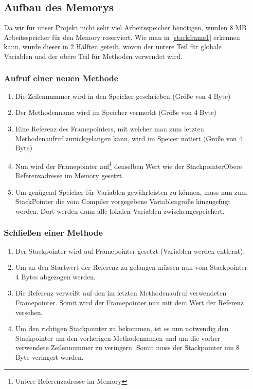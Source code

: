 \subsection{Aufbau des Memorys}
Da wir für unser Projekt nicht sehr viel Arbeitsspeicher benötigen, wurden 8 MB Arbeitsspeicher für den Memory reserviert.
Wie man in \ref{stackframe1} erkennen kann, wurde dieser in 2 Hälften geteilt, wovon der untere Teil für globale Variablen
und der obere Teil für Methoden verwendet wird.


\subsubsection{Aufruf einer neuen Methode}
\begin{enumerate}
 \item Die Zeilennummer wird in den Speicher geschrieben (Größe von 4 Byte)
 \item Der Methodenname wird im Speicher vermerkt (Größe von 4 Byte)
 \item Eine Referenz des Framepointers, mit welcher man zum letzten Methodenaufruf zurückgelangen kann, wird im Speicer notiert (Größe von 4 Byte)
 \item Nun wird der Framepointer auf\footnote{Untere Referenzadresse im Memory} denselben Wert wie der Stackpointer{Obere Referenzadresse im Memory} gesetzt.
 \item Um genügend Speicher für Variablen gewährleisten zu können, muss nun zum StackPointer die vom Compiler vorgegebene Variablengröße
 hinzugefügt werden. Dort werden dann alle lokalen Variablen zwischengespeichert.
\end{enumerate}
 
\subsubsection{Schließen einer Methode}
\begin{enumerate}
 \item Der Stackpointer wird auf Framepointer gesetzt (Variablen werden entfernt).
 \item Um an den Startwert der Referenz zu gelangen müssen nun vom Stackpointer 4 Bytes abgezogen werden.
 \item Die Referenz verweißt auf den im letzten Methodenaufruf verwendeten Framepointer. Somit wird der Framepointer nun mit dem Wert
 der Referenz versehen.
 \item Um den richtigen Stackpointer zu bekommen, ist es nun notwendig den Stackpointer um den vorherigen Methodennamen und um die vorher verwendete Zeilennummer zu veringern.
 Somit muss der Stackpointer um 8 Byte veringert werden.
\end{enumerate}

